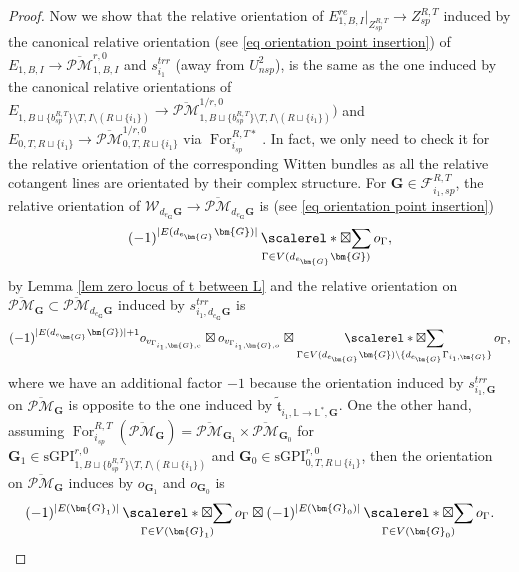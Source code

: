 \documentclass[11pt]{amsart}
\theoremstyle{definition}
\theoremstyle{remark}
\newcommand{\oPMb}{{\overline{\mathcal{PM}}}}
\newcommand{\<}{\left<}
\renewcommand{\>}{\right>}
\numberwithin{equation}{section}
\def\sGPI{\text{sGPI}}
\DeclareMathOperator*{\bboxtimes}{\scalerel*{\boxtimes}{\sum}}
\begin{document}
\begin{proof}
         Now we show that the relative orientation of  $E^{re}_{1,B,I}\vert_{Z_{sp}^{R,T}}\to Z_{sp}^{R,T}$ induced by the canonical relative orientation (see \eqref{eq orientation point insertion}) of $E_{1,B,I}\to \oPMb^{r,0}_{1,B,I}$ and $s^{trr}_{i_1}$ (away from $U^2_{nsp}$), is the same as the one induced by the canonical relative orientations of $E_{1,B\sqcup \{b^{R,T}_{sp}\} \setminus T,I\setminus (R\sqcup \{i_1\})} \to \oPMb^{1/r,0}_{1,B\sqcup \{b^{R,T}_{sp}\} \setminus T,I\setminus (R\sqcup \{i_1\})})$ and $E_{0,T,R\sqcup \{i_1\}} \to \oPMb^{1/r,0}_{0,T,R\sqcup \{i_1\}}$ via $\operatorname{For}_{i_{sp}}^{R,T*}$. In fact, we only need to check it for the relative orientation of the corresponding Witten bundles as all the relative cotangent lines are orientated by their complex structure. For $\bm{G}\in \mathcal F_{i_1,sp}^{R,T}$, the relative orientation of $\mathcal W_{d_{e_{\bm{G}}}\bm{G}}\to \oPMb_{d_{e_{\bm{G}}}\bm{G}}$ is (see \eqref{eq orientation point insertion}) 
         $$
         (-1)^{\lvert E(d_{e_{\bm{G}}}\bm{G})\rvert}\bboxtimes_{\Gamma\in V(d_{e_{\bm{G}}}\bm{G})} o_{\Gamma},
         $$
         by  Lemma \ref{lem zero locus of t between L} and \cite[Proposition 3.1 and Corollary 3.20]{TZ1}
         the relative orientation on $\oPMb_{\bm{G}}\subset  \oPMb_{d_{e_{\bm{G}}}\bm{G}}$ induced by $s^{trr}_{i_1,d_{e_{\bm{G}}}\bm{G}}$ is 
         \begin{equation}\label{eq induce rative orientation sp case}
         (-1)^{\lvert E(d_{e_{\bm{G}}}\bm{G})\rvert+1}o_{v_{\Gamma_{i_1,\bm{G},c}}}\boxtimes o_{v_{\Gamma_{i_1,\bm{G},o}}} \boxtimes\bboxtimes_{\Gamma\in V(d_{e_{\bm{G}}}\bm{G})\setminus \{d_{e_{\bm{G}}}\Gamma_{i_1,\bm{G}}\}} o_{\Gamma},
         \end{equation}
         where we have an additional factor $-1$ because the orientation induced by $s^{trr}_{i_1,\bm{G}}$ on $\oPMb_{\bm{G}}$ is opposite to the one induced by $\tilde{\mathfrak t}_{i_1,\mathbb L \to \mathbb L^*,\bm{G}}$. One the other hand, assuming $\operatorname{For}_{i_{sp}}^{R,T}(\oPMb_{\bm{G}})=\oPMb_{\bm{G}_1}\times \oPMb_{\bm{G}_0}$ for $\bm{G}_1\in \sGPI^{r,0}_{1,B\sqcup \{b^{R,T}_{sp}\} \setminus T,I\setminus (R\sqcup \{i_1\})}$ and $\bm{G}_0\in \sGPI^{r,0}_{0,T,R\sqcup \{i_1\}}$, then the orientation on  $\oPMb_{\bm{G}}$ induces by $o_{\bm{G}_1}$ and $o_{\bm{G}_0}$ is 
         \begin{equation}\label{eq orientation product after remove dash line}
             (-1)^{\lvert E(\bm{G}_1)\rvert}\bboxtimes_{\Gamma\in V(\bm{G}_1)} o_{\Gamma} \boxtimes (-1)^{\lvert E(\bm{G}_0)\rvert}\bboxtimes_{\Gamma\in V(\bm{G}_0)} o_{\Gamma}.

\end{equation}
\end{proof}
\end{document}
